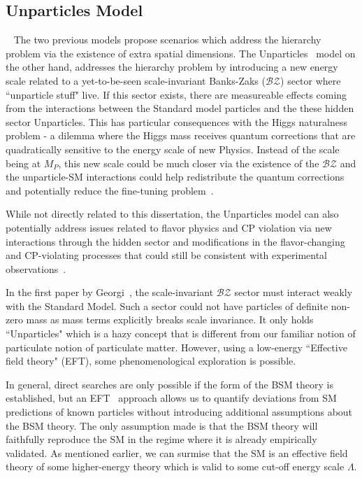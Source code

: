 \subsection{Unparticles Model}~\label{sec:UnparticlesModel}
The two previous models propose scenarios which address the hierarchy problem via the existence of extra spatial dimensions. The Unparticles~\cite{Georgi_2007unpar} model on the other hand, addresses the hierarchy problem by introducing a new energy scale related to a yet-to-be-seen scale-invariant Banks-Zaks ($\mathcal{BZ}$) sector where ``unparticle stuff" live. If this sector exists, there are measureable effects coming from the interactions between the Standard model particles and the these hidden sector Unparticles. This has particular consequences with the Higgs naturalness problem - a dilemma where the Higgs mass receives quantum corrections that are quadratically sensitive to the energy scale of new Physics. Instead of the scale being at $M_P$, this new scale could be much closer via the existence of the $\mathcal{BZ}$ and the unparticle-SM interactions could help redistribute the quantum corrections and potentially reduce the fine-tuning problem~\cite{Kikuchi:2007qd}.

While not directly related to this dissertation, the Unparticles model can also potentially address issues related to flavor physics and CP violation via new interactions through the hidden sector and modifications in the flavor-changing and CP-violating processes that could still be consistent with experimental observations~\cite{Georgi_2007unpar, Chen:2007vv,Freitas:2007ip, Zwicky:2007vv}.

In the first paper by Georgi~\cite{Georgi_2007unpar}, the scale-invariant $\mathcal{BZ}$ sector must interact weakly with the Standard Model. Such a sector could not have particles of definite non-zero mass as mass terms explicitly breaks scale invariance.
It only holds ``Unparticles" which is a hazy concept that is different from our familiar notion of particulate notion of particulate matter. However, using a low-energy ``Effective field theory" (EFT), some phenomenological exploration is possible. 


In general, direct searches are only possible if the form of the BSM theory is established, but an EFT~\cite{Georgi:1993mps} approach allows us to quantify deviations from SM predictions of known particles without introducing additional assumptions about the BSM theory. The only assumption made is that the BSM theory will faithfully reproduce the SM in the regime where it is already empirically validated. As mentioned earlier, we can surmise that the SM is an effective field theory of some higher-energy theory which is valid to some cut-off energy scale $\Lambda$. 

